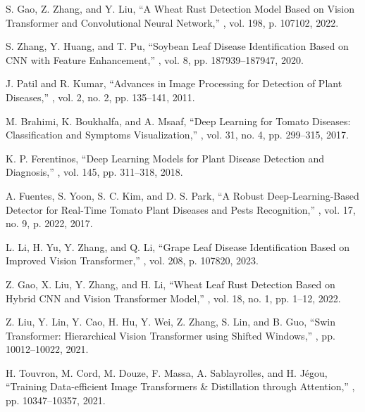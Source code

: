 \documentclass[preprint,12pt]{elsarticle}
\begin{document}
\begin{thebibliography}{99}
S. Gao, Z. Zhang, and Y. Liu,
\newblock ``A Wheat Rust Detection Model Based on Vision Transformer and Convolutional Neural Network,''
, vol. 198, p. 107102, 2022.

S. Zhang, Y. Huang, and T. Pu,
\newblock ``Soybean Leaf Disease Identification Based on CNN with Feature Enhancement,''
, vol. 8, pp. 187939–187947, 2020.

J. Patil and R. Kumar,
\newblock ``Advances in Image Processing for Detection of Plant Diseases,''
, vol. 2, no. 2, pp. 135--141, 2011.

M. Brahimi, K. Boukhalfa, and A. Msaaf,
\newblock ``Deep Learning for Tomato Diseases: Classification and Symptoms Visualization,''
, vol. 31, no. 4, pp. 299--315, 2017.

K. P. Ferentinos,
\newblock ``Deep Learning Models for Plant Disease Detection and Diagnosis,''
, vol. 145, pp. 311--318, 2018.

A. Fuentes, S. Yoon, S. C. Kim, and D. S. Park,
\newblock ``A Robust Deep-Learning-Based Detector for Real-Time Tomato Plant Diseases and Pests Recognition,''
, vol. 17, no. 9, p. 2022, 2017.

L. Li, H. Yu, Y. Zhang, and Q. Li,
\newblock ``Grape Leaf Disease Identification Based on Improved Vision Transformer,''
, vol. 208, p. 107820, 2023.

Z. Gao, X. Liu, Y. Zhang, and H. Li,
\newblock ``Wheat Leaf Rust Detection Based on Hybrid CNN and Vision Transformer Model,''
, vol. 18, no. 1, pp. 1--12, 2022.

Z. Liu, Y. Lin, Y. Cao, H. Hu, Y. Wei, Z. Zhang, S. Lin, and B. Guo,
\newblock ``Swin Transformer: Hierarchical Vision Transformer using Shifted Windows,''
, pp. 10012--10022, 2021.

H. Touvron, M. Cord, M. Douze, F. Massa, A. Sablayrolles, and H. Jégou,
\newblock ``Training Data-efficient Image Transformers & Distillation through Attention,''
, pp. 10347--10357, 2021.


\end{thebibliography}
\end{document}
